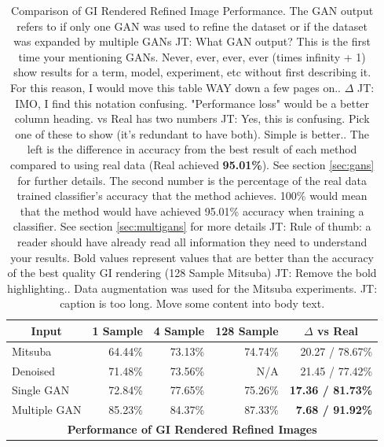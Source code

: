 \documentclass[10pt,twocolumn,letterpaper]{article}
\newcommand{\tompson}[1]{{\color{green} JT: #1}}
\begin{document}
\begin{table}[]
\centering
\begin{tabular}{|l|r|r|r|r|}
\hline
\multicolumn{1}{|c|}{\textbf{Input}}
& \multicolumn{1}{c|}{\textbf{1 Sample}}
& \multicolumn{1}{c|}{\textbf{4 Sample}}
& \multicolumn{1}{c|}{\textbf{128 Sample}}
& \multicolumn{1}{c|}{\textbf{$\Delta$ vs Real}} \\ \hline
Mitsuba		& 64.44\%	& 73.13\%	& 74.74\%	& 20.27 / 78.67\% \\
Denoised	& 71.48\%	& 73.56\%	& N/A 		& 21.45 / 77.42\%	\\
Single GAN	& 72.84\%	& 77.65\% 	& 75.26\%	& \textbf{17.36 / 81.73\%}	\\
Multiple GAN& 85.23\%	& 84.37\% 	& 87.33\% 	& \textbf{7.68 / 91.92\%}		\\ \hline
\multicolumn{5}{|c|}{\textbf{Performance of GI Rendered Refined Images}}	\\ \hline
\end{tabular}
\caption{Comparison of GI Rendered Refined Image Performance. The GAN output refers to if only one GAN was used to refine the dataset or if the dataset was expanded by multiple GANs\tompson{What GAN output? This is the first time your mentioning GANs. Never, ever, ever, ever (times infinity + 1) show results for a term, model, experiment, etc without first describing it. For this reason, I would move this table WAY down a few pages on.}. $\Delta$ \tompson{IMO, I find this notation confusing. "Performance loss" would be a better column heading.} vs Real has two numbers \tompson{Yes, this is confusing. Pick one of these to show (it's redundant to have both). Simple is better.}. The left is the difference in accuracy from the best result of each method compared to using real data (Real achieved \textbf{95.01\%}). See section \ref{sec:gans} for further details.  The second number is the percentage of the real data trained classifier's accuracy that the method achieves.  100\% would mean that the method would have achieved 95.01\% accuracy when training a classifier. See section \ref{sec:multigans} for more details \tompson{Rule of thumb: a reader should have already read all information they need to understand your results}. Bold values represent values that are better than the accuracy of the best quality GI rendering (128 Sample Mitsuba) \tompson{Remove the bold highlighting.}. Data augmentation was used for the Mitsuba experiments. \tompson{caption is too long. Move some content into body text.}}
\label{tblallrefined}
\end{table}
\end{document}
